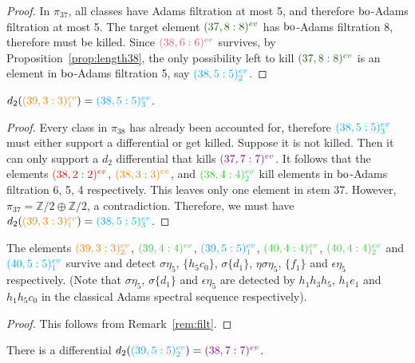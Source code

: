 \begin{proof}
In $\pi_{37}$, all classes have Adams filtration at most 5, and therefore $\bo$-Adams filtration at most 5. The target element $\evr{37}{8}{seagreen}$ has $\bo$-Adams filtration 8, therefore must be killed. Since $\evr{38}{6}{lavenderrose}$ survives, by Proposition~\ref{prop:length38}, the only possibility left to kill $\evr{37}{8}{seagreen}$ is an element in $\bo$-Adams filtration 5, say $\evrm{38}{5}{cyan}{2}$.
\end{proof}



\begin{prop}
$d_2(\evrm{39}{3}{orange}{1}) = \evrm{38}{5}{cyan}{3}$.
\end{prop}

\begin{proof}
Every class in $\pi_{38}$ has already been accounted for, therefore $\evrm{38}{5}{cyan}{3}$ must either support a differential or get killed. Suppose it is not killed. Then it can only support a $d_2$ differential that kills $\evr{37}{7}{darkmagenta}$. It follows that the elements $\evr{38}{2}{red}$, $\evr{38}{3}{orange}$, and $\evrm{38}{4}{limegreen}{2}$ kill elements in $\bo$-Adams filtration 6, 5, 4 respectively. This leaves only one element in stem 37. However, $\pi_{37}=\mathbb{Z}/2\oplus\mathbb{Z}/2$, a contradiction. Therefore, we must have $d_2(\evrm{39}{3}{orange}{1}) = \evrm{38}{5}{cyan}{3}$.
\end{proof}

\begin{prop}
The elements $\evrm{39}{3}{orange}{2}$, $\evr{39}{4}{limegreen}$, $\evrm{39}{5}{cyan}{1}$, $\evrm{40}{4}{limegreen}{1}$, $\evrm{40}{4}{limegreen}{2}$ and $\evrm{40}{5}{cyan}{1}$ survive and detect $\sigma\eta_5$, $\{h_5c_0\}$, $\sigma\{d_1\}$, $\eta\sigma\eta_5$, $\{f_1\}$ and $\epsilon\eta_5$ respectively. (Note that $\sigma\eta_5$, $\sigma\{d_1\}$ and $\epsilon\eta_5$ are detected by $h_1h_3h_5$, $h_1e_1$ and $h_1h_5c_0$ in the classical Adams spectral sequence respectively).
\end{prop}

\begin{proof}
This follows from Remark~\ref{rem:filt}.
\end{proof}

\begin{prop}There is a differential
$d_2(\evrm{39}{5}{cyan}{2}) = \evr{38}{7}{darkmagenta}$.
\end{prop}

